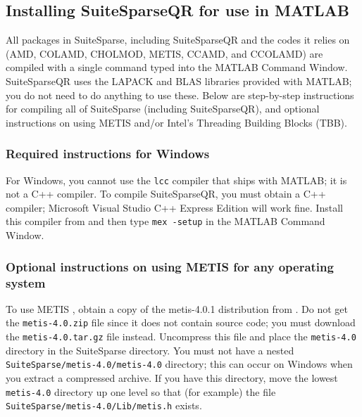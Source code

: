 \documentclass[12pt]{article}
\begin{document}
\subsection{Installing SuiteSparseQR for use in MATLAB}

All packages in SuiteSparse, including SuiteSparseQR and the codes it relies on
(AMD, COLAMD, CHOLMOD, METIS, CCAMD, and CCOLAMD) are compiled with a single
command typed into the MATLAB Command Window.  SuiteSparseQR uses the LAPACK
and BLAS libraries provided with MATLAB; you do not need to do anything to use
these.  Below are step-by-step instructions for compiling all of SuiteSparse
(including SuiteSparseQR), and optional instructions on using METIS and/or
Intel's Threading Building Blocks (TBB).

\subsubsection{Required instructions for Windows}

For Windows, you cannot use the \verb'lcc' compiler that ships with MATLAB; it
is not a C++ compiler.  To compile SuiteSparseQR, you must obtain a C++
compiler; Microsoft Visual Studio C++ Express Edition will work fine.  Install
this compiler from \newline
{}
and then type \verb'mex -setup' in the MATLAB Command Window.

\subsubsection{Optional instructions on using METIS for any operating system}

To use METIS \cite{KarypisKumar98e}, obtain a copy of the metis-4.0.1
distribution from \newline
{}.
Do not get the \verb'metis-4.0.zip' file since it does not contain source code;
you must download the \verb'metis-4.0.tar.gz' file instead.  Uncompress this
file and place the \verb'metis-4.0' directory in the SuiteSparse directory.
You must not have a nested \verb'SuiteSparse/metis-4.0/metis-4.0' directory;
this can occur on Windows when you extract a compressed archive.  If you have
this directory, move the lowest \verb'metis-4.0' directory up one level so that
(for example) the file \newline \verb'SuiteSparse/metis-4.0/Lib/metis.h'
exists.
\end{document}
